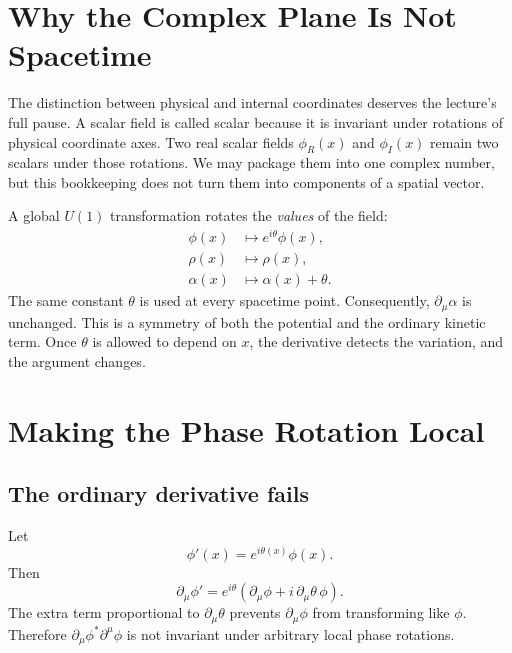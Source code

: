 \section{Why the Complex Plane Is Not Spacetime}

The distinction between physical and internal coordinates deserves the
lecture's full pause. A scalar field is called scalar because it is invariant
under rotations of physical coordinate axes. Two real scalar fields
\(\phi_R(x)\) and \(\phi_I(x)\) remain two scalars under those rotations. We
may package them into one complex number, but this bookkeeping does not turn
them into components of a spatial vector.

A global \(U(1)\) transformation rotates the \emph{values} of the field:
\begin{equation}
\begin{aligned}
  \phi(x)&\longmapsto e^{i\theta}\phi(x),
  \\
  \rho(x)&\longmapsto\rho(x),
  \\
  \alpha(x)&\longmapsto\alpha(x)+\theta.
\end{aligned}
  \label{eq:l08-global-shift}
\end{equation}
The same constant \(\theta\) is used at every spacetime point. Consequently,
\(\partial_\mu\alpha\) is unchanged. This is a symmetry of both the potential
and the ordinary kinetic term. Once \(\theta\) is allowed to depend on
\(x\), the derivative detects the variation, and the argument changes.

\section{Making the Phase Rotation Local}

\subsection{The ordinary derivative fails}

Let
\begin{equation}
  \phi'(x)=e^{i\theta(x)}\phi(x).
  \label{eq:l08-local-phase}
\end{equation}
Then
\begin{equation}
  \partial_\mu\phi'
  =e^{i\theta}
    \left(\partial_\mu\phi+i\,\partial_\mu\theta\,\phi\right).
  \label{eq:l08-ordinary-derivative-fails}
\end{equation}
The extra term proportional to \(\partial_\mu\theta\) prevents
\(\partial_\mu\phi\) from transforming like \(\phi\). Therefore
\(\partial_\mu\phi^*\partial^\mu\phi\) is not invariant under arbitrary local
phase rotations.

